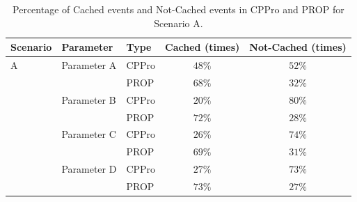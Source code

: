 \documentclass[10pt,final,journal,a4paper]{IEEEtran}
\begin{document}
\begin{table}[!t]
\caption{Percentage of Cached events and Not-Cached events in CPPro and PROP for Scenario A.}
\label{tab:stacked1sca}
\begin{tabular}{|l|l|l|c|c|}
\hline
Scenario & Parameter & Type & Cached (times)& Not-Cached (times) \\ %
\hline
A & Parameter A & CPPro &  $48\%$ & $52\%$ \\%
\hline
 &  & PROP & $68\%$ & $32\%$ \\ %
\hline

& Parameter B & CPPro & $20\%$ & $80\%$ \\ %
\hline
& & PROP & $72\%$ & $28\%$ \\%
\hline
& Parameter C & CPPro & $26\%$ & $74\%$  \\%
\hline
 & & PROP & $69\%$ & $31\%$ \\%
\hline

& Parameter D & CPPro & $27\%$ & $73\%$  \\%
\hline
 & & PROP & $73\%$ & $27\%$ \\%
\hline

\end{tabular}
\end{table}
\end{document}
